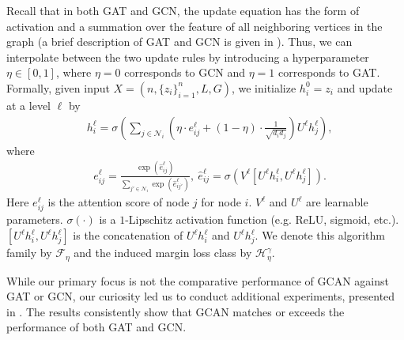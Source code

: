 Recall that in both GAT and GCN, the update equation has the form of activation and a summation over the feature of all neighboring vertices in the graph (a brief description of GAT and GCN is given in ). Thus, we can interpolate between the two update rules by introducing a hyperparameter $\eta \in [0,1]$, where $\eta = 0$ corresponds to GCN and $\eta=1$ corresponds to GAT. Formally, given input $X = (n, \{z_i\}_{i=1}^n, L, G)$, we initialize $h_i^0 = z_i$ and update at a level $\ell$ by
\begin{align*}
    &h_i^{\ell} = \sigma\left(\sum_{j \in \mathcal{N}_i} \left(\eta \cdot e_{ij}^{\ell} + (1 - \eta) \cdot \frac{1}{\sqrt{d_i d_j }} \right)  U^{\ell}  h_j^{\ell} \right),
\end{align*}
{where}
\begin{align*}
    &e_{ij}^{\ell} = \frac{\exp(\hat{e}_{ij}^{\ell})}{\sum_{j' \in \mathcal{N}_i} \exp(\hat{e}_{ij'}^{\ell})}, ~ \hat{e}_{ij}^{\ell} = \sigma(V^{\ell} [U^{\ell}h_i^{\ell}, U^{\ell}h_j^{\ell}]).
\end{align*}
Here $e_{ij}^{\ell}$ is the attention score of node $j$ for node $i$. $V^{\ell}$ and $U^{\ell}$ are learnable parameters. $\sigma(\cdot)$ is a $1$-Lipschitz activation function (e.g. ReLU, sigmoid, etc.).
$[U^{\ell}h_i^{\ell}, U^{\ell}h_j^{\ell}]$ is the concatenation of $U^{\ell}h_i^{\ell}$ and $U^{\ell}h_j^{\ell}$. 
%
We denote this algorithm family by $\mathcal{F}_\eta$ and the induced margin loss class by $\mathcal{H}_\eta^\gamma$. 


While our primary focus is not the comparative performance of GCAN against GAT or GCN, our curiosity led us to conduct additional experiments, presented in . The results consistently show that GCAN matches or exceeds the performance of both GAT and GCN.

